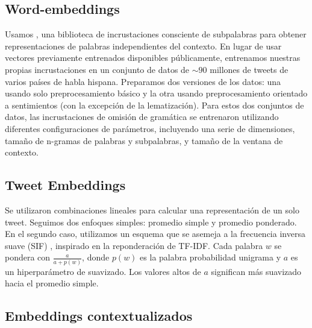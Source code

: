\subsection {Word-embeddings}

Usamos \fasttext {}, una biblioteca de incrustaciones consciente de subpalabras \cite{bojanowski16} para obtener representaciones de palabras independientes del contexto.
En lugar de usar vectores previamente entrenados disponibles públicamente, entrenamos nuestras propias incrustaciones en un conjunto de datos de $ \sim90 $ millones de tweets de varios países de habla hispana.
Preparamos dos versiones de los datos: una usando solo preprocesamiento básico y la otra usando preprocesamiento orientado a sentimientos (con la excepción de la lematización). Para estos dos conjuntos de datos, las incrustaciones de omisión de gramática se entrenaron utilizando diferentes configuraciones de parámetros, incluyendo una serie de dimensiones, tamaño de n-gramas de palabras y subpalabras, y tamaño de la ventana de contexto.

\subsection{Tweet Embeddings}
\label{sec:sif}

Se utilizaron combinaciones lineales para calcular una representación de un solo tweet.
Seguimos dos enfoques simples: promedio simple y promedio ponderado. En el segundo caso, utilizamos un esquema que se asemeja a la frecuencia inversa suave (SIF) \cite {arora17}, inspirado en la reponderación de TF-IDF.
Cada palabra $ w $ se pondera con $ \frac {a} {a + p (w)} $, donde $ p (w) $ es la palabra probabilidad unigrama y $ a $ es un hiperparámetro de suavizado.
Los valores altos de $ a $ significan más suavizado hacia el promedio simple.



\subsection{Embeddings contextualizados}
\label{subsec:elmo}

